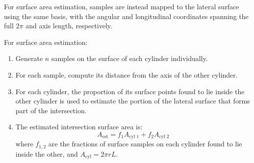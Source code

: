 \documentclass[authoryear]{elsarticle}
\begin{document}
    For surface area estimation, samples are instead mapped to the lateral surface using the same basis, with the angular and longitudinal coordinates spanning the full $2\pi$ and axis length, respectively.
    
    For surface area estimation:
    
    \begin{enumerate}
        \item Generate $n$ samples on the surface of each cylinder individually.
        \item For each sample, compute its distance from the axis of the other cylinder.
        \item For each cylinder, the proportion of its surface points found to lie inside the other cylinder is used to estimate the portion of the lateral surface that forms part of the intersection.
        \item The estimated intersection surface area is:
        \[
        A_{\text{est}} = f_{1}A_{\text{cyl 1}} + f_{2}A_{\text{cyl 2}}
        \]
        where $f_{1,2}$ are the fractions of surface samples on each cylinder found to lie inside the other, and $A_{\text{cyl}} = 2\pi rL$.
    \end{enumerate}



\newpage
\end{document}
